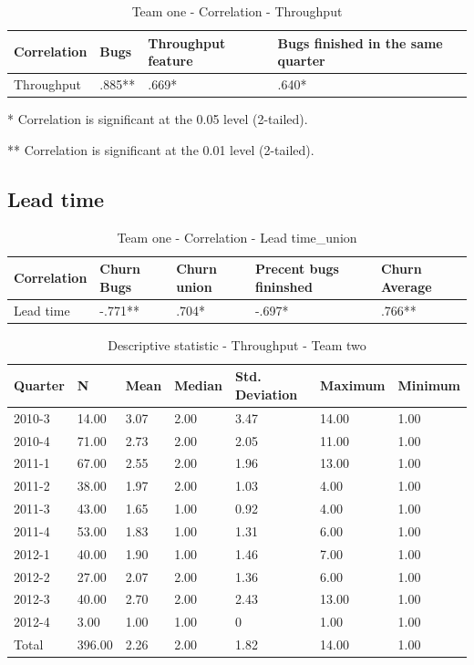 \documentclass[UKenglish]{ifimaster}  %
\begin{document}
\begin{table}[!htbp] 
 \centering 
 \begin{tabular}{|l|l|l|l|} 
\hline 
Correlation  & Bugs & Throughput feature & Bugs finished in the same quarter\\ \hline  %
	Throughput & .885** & .669* & .640* \\ \hline 

\end{tabular} 
 \caption{Team one - Correlation - Throughput} 
 \label{tc:2}
  \centerline {* Correlation is significant at the 0.05 level (2-tailed).}
      \centerline{  ** Correlation is significant at the 0.01 level (2-tailed).}
 \end{table} 
 \newpage
\subsection {Lead time}
\begin{table}[!htbp] 
 \centering 
 \begin{tabular}{|l|l|l|l|l|} 
\hline 
Correlation  & Churn Bugs & Churn union & Precent bugs fininshed & Churn Average \\ \hline 
	Lead time & -.771** & .704* & -.697* & .766** \\ \hline
\end{tabular} 
 \caption{Team one - Correlation - 	Lead time\_union} 
 \end{table}   
 
    \begin{table}[!htbp]
   \centering
 \begin{tabular}{ | l | l | l | l | l | l | l | }
\hline
	Quarter & N & Mean & Median & Std. Deviation & Maximum & Minimum \\ \hline
	2010-3 & 14.00 & 3.07 & 2.00 & 3.47 & 14.00 & 1.00\\ \hline
	2010-4 & 71.00 & 2.73 & 2.00 & 2.05 & 11.00 & 1.00\\ \hline
	2011-1 & 67.00 & 2.55 & 2.00 & 1.96 & 13.00 & 1.00\\ \hline
	2011-2 & 38.00 & 1.97 & 2.00 & 1.03 & 4.00 & 1.00\\ \hline
	2011-3 & 43.00 & 1.65 & 1.00 & 0.92 & 4.00 & 1.00\\ \hline
	2011-4 & 53.00 & 1.83 & 1.00 & 1.31 & 6.00 & 1.00\\ \hline
	2012-1 & 40.00 & 1.90 & 1.00 & 1.46 & 7.00 & 1.00\\ \hline
	2012-2 & 27.00 & 2.07 & 2.00 & 1.36 & 6.00 & 1.00\\ \hline
	2012-3 & 40.00 & 2.70 & 2.00 & 2.43 & 13.00 & 1.00\\ \hline
	2012-4 & 3.00 & 1.00 & 1.00 & 0 & 1.00 & 1.00\\ \hline
	Total & 396.00 & 2.26 & 2.00 & 1.82 & 14.00 & 1.00\\ \hline
	 \end{tabular}
  	  \caption{ Descriptive statistic - Throughput - Team two}%
\end{table}
 \newpage 
\end{document}

